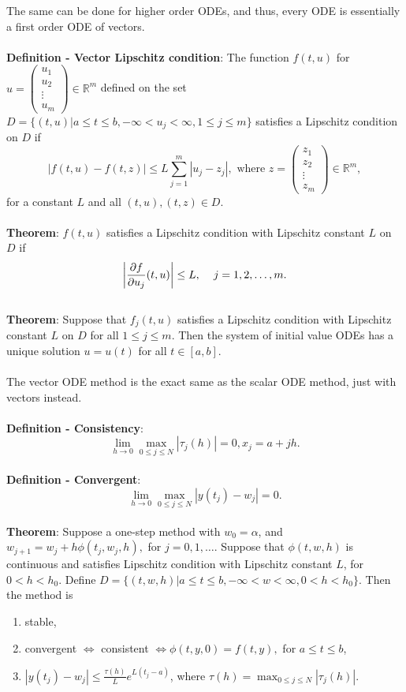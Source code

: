 \documentclass{article}
\begin{document}
The same can be done for higher order ODEs, and thus, every ODE is essentially a first order ODE of vectors. \\ \\
\textbf{Definition - Vector Lipschitz condition}: The function $f(t, u)$ for $u = \begin{pmatrix}
    u_1 \\ u_2 \\ \vdots \\ u_m
\end{pmatrix} \in \mathbb{R}^m$ defined on the set $D = \{ (t, u) | a \leq t \leq b, -\infty < u_j < \infty, 1 \leq j \leq m\}$ satisfies a Lipschitz condition on $D$ if $$|f(t, u) - f(t, z)| \leq L \sum_{j = 1}^m |u_j - z_j|, \text{ where } z = \begin{pmatrix}
    z_1 \\ z_2 \\ \vdots \\ z_m
\end{pmatrix} \in \mathbb{R}^m,$$ for a constant $L$ and all $(t, u), (t, z) \in D$. \\ \\
\textbf{Theorem}: $f (t, u)$ satisfies a Lipschitz condition with Lipschitz constant $L$ on $D$ if $$\left| \frac{\partial f}{\partial u_j} (t, u) \right| \leq L, \hspace{0.4cm} j = 1, 2, \dots, m.$$ \\
\textbf{Theorem}: Suppose that $f_j(t, u)$ satisfies a Lipschitz condition with Lipschitz constant $L$ on $D$ for all $1 \leq j \leq m$. Then the system of initial value ODEs has a unique solution $u = u(t)$ for all $t \in [a, b]$. \\ \\
The vector ODE method is the exact same as the scalar ODE method, just with vectors instead. \\ \\
\textbf{Definition - Consistency}: $$\lim_{h \rightarrow 0} \max_{0 \leq j \leq N} |\tau_j(h)| = 0, x_j = a + jh.$$ \\
\textbf{Definition - Convergent}:  $$\lim_{h \rightarrow 0} \max_{0 \leq j \leq N} |y(t_j) - w_j| = 0.$$ \\
\textbf{Theorem}: Suppose a one-step method with $w_0 = \alpha$, and $w_{j + 1} = w_j + h \phi(t_j, w_j, h),$ for $j = 0, 1, \dots$. Suppose that $\phi(t, w, h)$ is continuous and satisfies Lipschitz condition with Lipschitz constant $L$, for $0 < h < h_0$. Define $D = \{ (t, w, h) | a \leq t \leq b, -\infty < w < \infty, 0 < h < h_0\}.$ Then the method is \begin{enumerate}
    \item stable,
    \item convergent $\iff$ consistent $\iff \phi(t, y, 0) = f(t, y),$ for $a \leq t \leq b$,
    \item $|y(t_j) - w_j| \leq \frac{\tau(h)}{L} e^{L(t_j - a)}$, where $\tau(h) = \max_{0 \leq j \leq N} |\tau_j(h)|.$
\end{enumerate} $ $ \\
\end{document}
